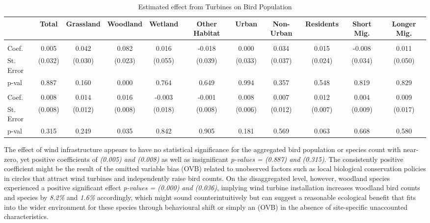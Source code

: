 \documentclass{article}
\begin{document}
\begin{table}[!ht]
\centering
\caption{Estimated effect from Turbines on Bird Population}
\begin{adjustbox}{width=\textwidth}
\begin{tabular}{@{}lcccccccccc@{}}
\toprule
 & Total & Grassland & Woodland & Wetland & Other Habitat & Urban & Non-Urban & Residents & Short Mig. & Longer Mig. \\
\midrule
\addlinespace
\multicolumn{11}{l}{\hspace{-0.5em}\textbf{Total count}} \\
Coef. & 0.005 & 0.042 & 0.082 & 0.016 & -0.018 & 0.000 & 0.034 & 0.015 & -0.008 & 0.011 \\
St. Error & (0.032) & (0.030) & (0.023) & (0.055) & (0.039) & (0.033) & (0.037) & (0.024) & (0.034) & (0.050) \\
p-val & 0.887 & 0.160 & 0.000 & 0.764 & 0.649 & 0.994 & 0.357 & 0.548 & 0.819 & 0.829 \\
\addlinespace
\multicolumn{11}{l}{\hspace{-0.5em}\textbf{Total species}} \\
Coef. & 0.008 & 0.014 & 0.016 & -0.003 & -0.001 & 0.008 & 0.007 & 0.012 & 0.004 & 0.009 \\
St. Error & (0.008) & (0.012) & (0.008) & (0.018) & (0.008) & (0.006) & (0.012) & (0.007) & (0.009) & (0.017) \\
p-val & 0.315 & 0.249 & 0.035 & 0.842 & 0.905 & 0.181 & 0.569 & 0.063 & 0.668 & 0.580 \\
\bottomrule
\end{tabular}
\end{adjustbox}
\end{table}

\addlinespace

The effect of wind infrastructure appears to have no statistical significance for the aggregated bird population or species count with near-zero, yet positive coefficients of \textit{(0.005) and (0.008)} as well as insignificant \textit{p-values = (0.887) and (0.315)}. The consistently positive coefficient might be the result of the omitted variable bias (OVB) related to unobserved factors such as local biological conservation policies in circles that attract wind turbines and independently raise bird counts. On the disaggregated level, however, woodland species experienced a positive significant effect \textit{p-values = (0.000) and (0.036)}, implying wind turbine installation increases woodland bird counts and species by \textit{8.2\%} and \textit{1.6\%} accordingly, which might sound counterintuitively but can suggest a reasonable ecological benefit that fits into the wider environment for these species through behavioural shift or simply an (OVB) in the absence of site-specific unaccounted characteristics.
\end{document}
